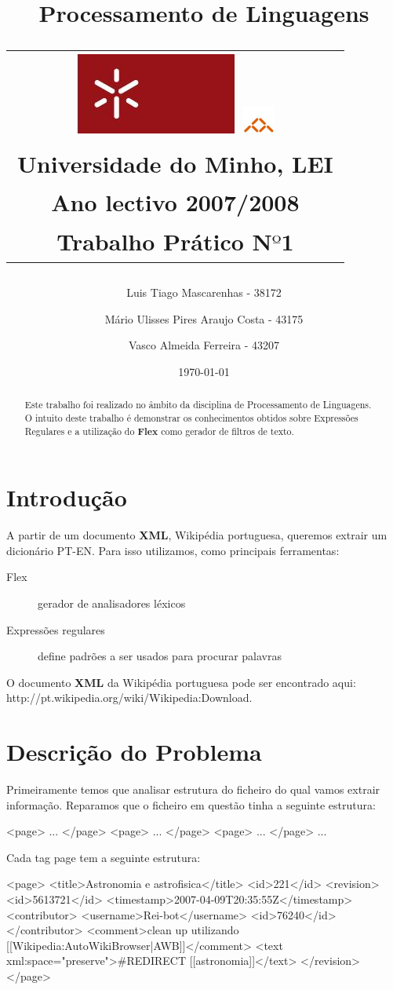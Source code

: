 \documentclass[11pt,a4paper]{article}
\title{\sf  Processamento de Linguagens \\
\begin{tabular}{c}
    \includegraphics[width=.1\textwidth]{stuff/uminho.jpg}
    \includegraphics[width=.07\textwidth]{stuff/informatica.jpg}\\
    {\small Universidade do Minho}, {\small LEI}\\
    {\small Ano lectivo 2007/2008}\\
    {\small Trabalho Prático N$º$1}\\
\end{tabular}
}
\author{
    {\small Luis Tiago Mascarenhas - 38172} \and
    {\small Mário Ulisses Pires Araujo Costa - 43175} \and
    {\small Vasco Almeida Ferreira - 43207}}
\date{{\small \today}}
\begin{document}
\maketitle

\begin{abstract}
Este trabalho foi realizado no âmbito da disciplina de Processamento de Linguagens.\\
O intuito deste trabalho é demonstrar os conhecimentos obtidos sobre Expressões Regulares e a utilização do \textbf{Flex} como gerador de filtros de texto.
\end{abstract}

\tableofcontents

\section{Introdu\c c\~ao}
A partir de um documento \textbf{XML}, Wikipédia portuguesa, queremos extrair um dicionário PT-EN. Para isso utilizamos, como principais ferramentas:
\begin{description}
 \item[Flex] gerador de analisadores léxicos
 \item[Expressões regulares] define padrões a ser usados para procurar palavras\\
\end{description}

\noindent O documento \textbf{XML} da Wikipédia portuguesa pode ser encontrado aqui:\\
\textsf{http://pt.wikipedia.org/wiki/Wikipedia:Download}.
\section{Descrição do Problema}
Primeiramente temos que analisar estrutura do ficheiro do qual vamos extrair informação. Reparamos que o ficheiro em questão tinha a seguinte estrutura:\\
\begin{code_xml}
 <page>
     ...
 </page>
 <page>
     ...
 </page>
 <page>
     ...
 </page>
 ...
\end{code_xml}

Cada tag \textsf{page} tem a seguinte estrutura:\\

\begin{code_xml}
  <page>
    <title>Astronomia e astrofisica</title>
    <id>221</id>
    <revision>
      <id>5613721</id>
      <timestamp>2007-04-09T20:35:55Z</timestamp>
      <contributor>
        <username>Rei-bot</username>
        <id>76240</id>
      </contributor>
      <comment>clean up  utilizando [[Wikipedia:AutoWikiBrowser|AWB]]</comment>
      <text xml:space="preserve">#REDIRECT [[astronomia]]</text>
    </revision>
  </page>
\end{code_xml}
\end{document}
